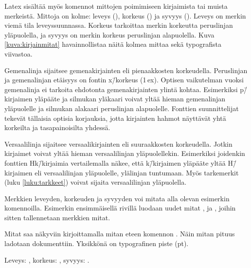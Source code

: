 Latex sisältää myös komennot mittojen poimimiseen kirjaimista tai muista
merkeistä. Mittoja on kolme: leveys (), korkeus
() ja syvyys (). Leveys on merkin
viemä tila leveyssuunnassa. Korkeus tarkoittaa merkin korkeutta
peruslinjan yläpuolella, ja syvyys on merkin korkeus peruslinjan
alapuolella. Kuva \ref{kuva:kirjainmitat} havainnollistaa näitä kolmea
mittaa sekä typografista viivastoa.

Gemenalinja sijaitsee gemenakirjainten eli pienaakkosten korkeudella.
Peruslinjan ja gemenalinjan etäisyys on fontin x\=/korkeus (1\,ex).
Optisen vaikutelman vuoksi gemenalinja ei tarkoita ehdotonta
gemenakirjainten ylintä kohtaa. Esimerkiksi p\=/kirjaimen yläpääte ja
silmukan yläkaari voivat yltää hieman gemenalinjan yläpuolelle ja
silmukan alakaari peruslinjan alapuolelle. Fonttien suunnittelijat
tekevät tällaisia optisia korjauksia, jotta kirjainten hahmot näyttävät
yhtä korkeilta ja tasapainoisilta yhdessä.

Versaalilinja sijaitsee versaalikirjainten eli suuraakkosten
korkeudella. Jotkin kirjaimet voivat yltää hieman versaalilinjan
yläpuolellekin. Esimerkiksi joidenkin fonttien Hk\=/kirjaimia
vertailemalla näkee, että k\=/kirjaimen yläpääte yltää H\=/kirjaimen eli
versaalilinjan yläpuolelle, ylälinjan tuntumaan. Myös tarkemerkit (luku
\ref{luku:tarkkeet}) voivat sijaita versaalilinjan yläpuolella.

\pagebreak[3]

Merkkien leveyden, korkeuden ja syvyyden voi mitata alla olevan
esimerkin komennoilla. Esimerkin ensimmäisellä rivillä luodaan uudet
mitat ,  ja , joihin sitten tallennetaan merkkien mitat.

\begin{koodilohkosis}
  \newlength{\leveys} \newlength{\korkeus} \newlength{\syvyys}
  \settowidth{\leveys}{abc} %
\end{koodilohkosis}

\pagebreak[3]

Mitat saa näkyviin kirjoittamalla mitan eteen komennon . Näin mitan pituus ladotaan dokumenttiin. Yksikkönä on
typografinen piste (pt).

\begin{koodilohkosis}
  Leveys: \the\leveys, korkeus: \the\korkeus, syvyys: \the\syvyys.
\end{koodilohkosis}

